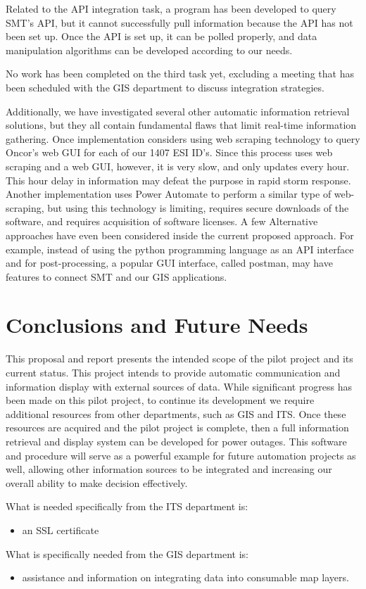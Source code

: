 \documentclass[letterpaper, notitlepage]{report}
\begin{document}
Related to the API integration task, a program has been developed to query SMT's API, but it cannot successfully pull information because the API has not been set up. Once the API is set up, it can be polled properly, and data manipulation algorithms can be developed according to our needs.

No work has been completed on the third task yet, excluding a meeting that has been scheduled with the GIS department to discuss integration strategies. 

Additionally, we have investigated several other automatic information retrieval solutions, but they all contain fundamental flaws that limit real-time information gathering. Once implementation considers using web scraping technology to query Oncor's web GUI for each of our 1407 ESI ID's. Since this process uses web scraping and a web GUI, however, it is very slow, and only updates every hour. This hour delay in information may defeat the purpose in rapid storm response. Another implementation uses Power Automate to perform a similar type of web-scraping, but using this technology is limiting, requires secure downloads of the software, and requires acquisition of software licenses. A few Alternative approaches have even been considered inside the current proposed approach. For example, instead of using the python programming language as an API interface and for post-processing, a popular GUI interface, called postman, may have features to connect SMT and our GIS applications.

\section{Conclusions and Future Needs}

This proposal and report presents the intended scope of the pilot project and its current status. This project intends to provide automatic communication and information display with external sources of data. While significant progress has been made on this pilot project, to continue its development we require additional resources from other departments, such as GIS and ITS. Once these resources are acquired and the pilot project is complete, then a full information retrieval and display system can be developed for power outages. This software and procedure will serve as a powerful example for future automation projects as well, allowing other information sources to be integrated and increasing our overall ability to make decision effectively.

What is needed specifically from the ITS department is:
\begin{itemize}
    \item an SSL certificate
\end{itemize}

What is specifically needed from the GIS department is:
\begin{itemize}
    \item assistance and information on integrating data into consumable map layers.
\end{itemize}
\end{document}
